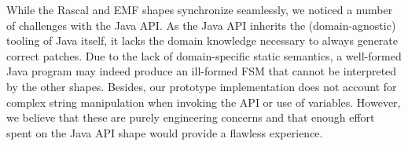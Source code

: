 While the Rascal and EMF shapes synchronize seamlessly, we noticed a number of challenges with the Java API.
As the Java API inherits the (domain-agnostic) tooling of Java itself, it lacks the domain knowledge necessary to always generate correct patches.
Due to the lack of domain-specific static semantics, a well-formed Java program may indeed produce an ill-formed FSM that cannot be interpreted by the other shapes.
Besides, our prototype implementation does not account for complex string manipulation when invoking the API or use of variables.
However, we believe that these are purely engineering concerns and that enough effort spent on the Java API shape would provide a flawless experience.


%
